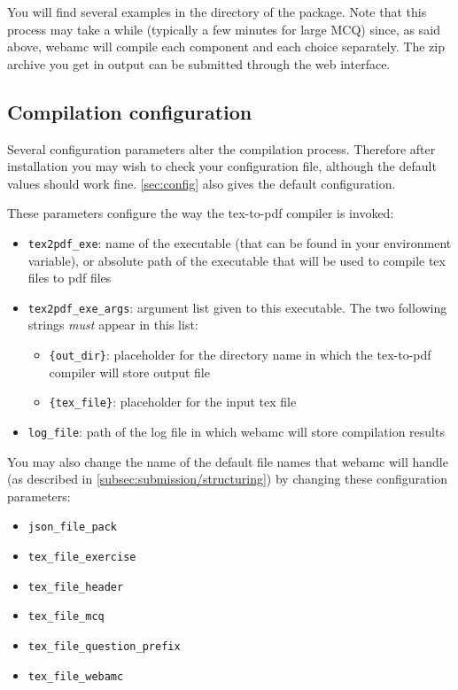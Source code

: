 You will find several examples in the  directory of the
package. Note that this process may take a while (typically a few
minutes for large MCQ) since, as said above, webamc will compile each
component and each choice separately. The zip archive you get in output
can be submitted through the web interface.
\subsection{Compilation configuration}
\label{subsec:submission/configuration}
Several configuration parameters alter the compilation process.
Therefore after installation you may wish to check your configuration
file, although the default values should work
fine. \cref{sec:config} also gives the default configuration.

These parameters configure the way the tex-to-pdf compiler is invoked:
\begin{itemize}
\item \texttt{tex2pdf\_exe}: name of the executable (that can be found
  in your  environment variable), or absolute path of the
  executable that will be used to compile tex files to pdf files
\item \texttt{tex2pdf\_exe\_args}: argument list given to this
  executable. The two following strings {\em must} appear in this
  list:
  \begin{itemize}
  \item \texttt{\{out\_dir\}}: placeholder for the directory name in
    which the tex-to-pdf compiler will store output file
  \item \texttt{\{tex\_file\}}: placeholder for the input tex file
  \end{itemize}
\item \texttt{log\_file}: path of the log file in which webamc will
  store compilation results
\end{itemize}

You may also change the name of the default file names that webamc
will handle (as described in \cref{subsec:submission/structuring}) by
changing these configuration parameters:
\begin{itemize}
\item \texttt{json\_file\_pack}
\item \texttt{tex\_file\_exercise}
\item \texttt{tex\_file\_header}
\item \texttt{tex\_file\_mcq}
\item \texttt{tex\_file\_question\_prefix}
\item \texttt{tex\_file\_webamc}
\end{itemize}

